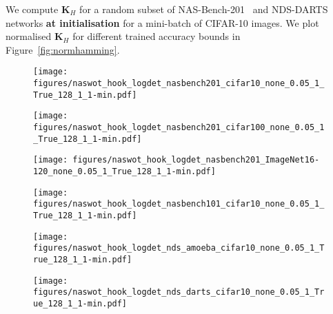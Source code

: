 \documentclass{article}
\newcommand{\matr}[1]{\mathbf{#1}}
\begin{document}
We compute $\matr{K}_H$ for a random subset of NAS-Bench-201~\citep{Dong2020NAS-Bench-201} and NDS-DARTS \citep{radosavovic2019network} networks {\bf at initialisation} for a mini-batch of CIFAR-10 images. We plot normalised $\matr{K}_H$ for different trained accuracy bounds in Figure~\ref{fig:normhamming}.

\begin{figure*}[!ht]

     \centering
     \begin{subfigure}[b]{0.3\textwidth}
         \centering
         \texttt{[image: figures/naswot\_hook\_logdet\_nasbench201\_cifar10\_none\_0.05\_1\_True\_128\_1\_1-min.pdf]}
         \caption{}
     \end{subfigure}
     \hfill
     \begin{subfigure}[b]{0.3\textwidth}
         \centering
         \texttt{[image: figures/naswot\_hook\_logdet\_nasbench201\_cifar100\_none\_0.05\_1\_True\_128\_1\_1-min.pdf]}
         \caption{}
     \end{subfigure}
     \hfill
     \begin{subfigure}[b]{0.3\textwidth}
         \centering
         \texttt{[image: figures/naswot\_hook\_logdet\_nasbench201\_ImageNet16-120\_none\_0.05\_1\_True\_128\_1\_1-min.pdf]}
         \caption{}
         \label{fig:pnas}
     \end{subfigure}

    \centering
     \begin{subfigure}[b]{0.3\textwidth}
         \centering

         \texttt{[image: figures/naswot\_hook\_logdet\_nasbench101\_cifar10\_none\_0.05\_1\_True\_128\_1\_1-min.pdf]}
         \caption{}
     \end{subfigure}
     \hfill
     \begin{subfigure}[b]{0.3\textwidth}
         \centering

         \texttt{[image: figures/naswot\_hook\_logdet\_nds\_amoeba\_cifar10\_none\_0.05\_1\_True\_128\_1\_1-min.pdf]}
         \caption{}
     \end{subfigure}
     \hfill
     \begin{subfigure}[b]{0.3\textwidth}
         \centering
         \texttt{[image: figures/naswot\_hook\_logdet\_nds\_darts\_cifar10\_none\_0.05\_1\_True\_128\_1\_1-min.pdf]}
         \caption{}
     \end{subfigure}

    
    \centering
     \begin{subfigure}[b]{0.3\textwidth}
         \centering


\end{subfigure}
\end{figure*}
\end{document}
